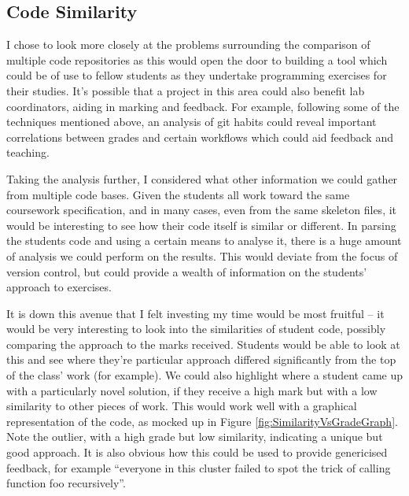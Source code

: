 \subsection{Code Similarity}

I chose to look more closely at the problems surrounding the comparison of
multiple code repositories as this would open the door to building a tool which
could be of use to fellow students as they undertake programming exercises for
their studies. It's possible that a project in this area could also benefit lab
coordinators, aiding in marking and feedback. For example, following some of the
techniques mentioned above, an analysis of git habits could reveal important
correlations between grades and certain workflows which could aid feedback and teaching.

Taking the analysis further, I considered what other information we could gather
from multiple code bases. Given the students all work toward the same coursework
specification, and in many cases, even from the same skeleton files, it would be
interesting to see how their code itself is similar or different. In parsing
the students code and using a certain means to analyse it, there is a huge 
amount of analysis we could perform on the results. This would
deviate from the focus of version control, but could provide a wealth of 
information on the students' approach to exercises.

It is down this avenue that I felt investing my time would be most fruitful --
it would be very interesting to look into the similarities of student code,
possibly comparing the approach to the marks received. Students would be
able to look at this and see where they're particular approach differed
significantly from the top of the class' work (for example). We could also
highlight where a student came up with a particularly novel solution, if they
receive a high mark but with a low similarity to other pieces of work. This
would work well with a graphical representation of the code, as mocked up in
Figure \ref{fig:SimilarityVsGradeGraph}. Note the outlier, with a high grade but
low similarity, indicating a unique but good approach. It is also obvious how
this could be used to provide genericised feedback, for example ``everyone in
this cluster failed to spot the trick of calling function foo recursively''.

